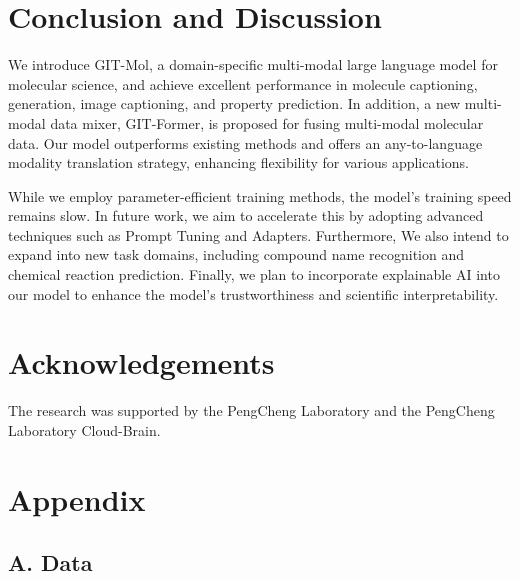 \documentclass{article}
\begin{document}
\section{Conclusion and Discussion}
\label{sec:con}
We introduce GIT-Mol, a domain-specific multi-modal large language model for molecular science, and achieve excellent performance in molecule captioning, generation, image captioning, and property prediction. In addition, a new multi-modal data mixer, GIT-Former, is proposed for fusing multi-modal molecular data. Our model outperforms existing methods and offers an any-to-language modality translation strategy, enhancing flexibility for various applications.

While we employ parameter-efficient training methods, the model's training speed remains slow. In future work, we aim to accelerate this by adopting advanced techniques such as Prompt Tuning and Adapters.
Furthermore, We also intend to expand into new task domains, including compound name recognition and chemical reaction prediction.
Finally, we plan to incorporate explainable AI into our model to enhance the model's trustworthiness and scientific interpretability.

\section{Acknowledgements}
The research was supported by the PengCheng Laboratory and the PengCheng Laboratory Cloud-Brain.







































\section*{Appendix}
\label{app:Appendix}
\subsection*{A. Data}
\end{document}

